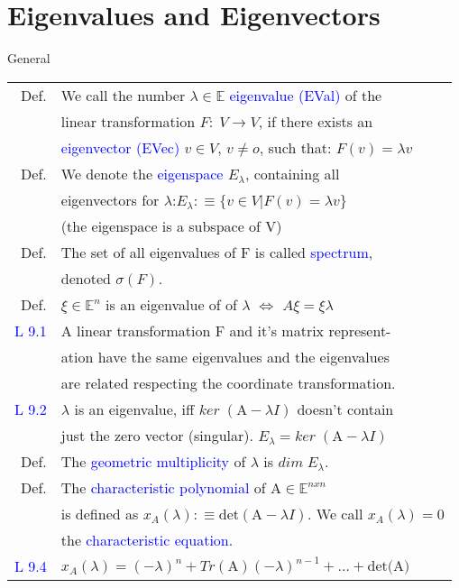 \section{Eigenvalues and Eigenvectors}
\begin{mainbox}{General}
\setlength{\tabcolsep}{2pt}
\begin{tabular}{rl}
	Def. & We call the number $\lambda\in\mathbb{E}$ \textcolor{blue}{eigenvalue (EVal)} of the\\
	& linear transformation $F:\;V\rightarrow V$, if there exists an\\
	& \textcolor{blue}{eigenvector (EVec)} $v\in V$, $v\neq o$, such that: $F(v) = \lambda v$\\
	\rule{0pt}{3ex}
	Def. & We denote the \textcolor{blue}{eigenspace} $E_\lambda$, containing all\\
	& eigenvectors for $\lambda$:\quad $E_\lambda :\equiv \{v\in V | F(v) = \lambda v\}$\\
	& (the eigenspace is a subspace of V)\\
	\rule{0pt}{3ex}
	Def. & The set of all eigenvalues of F is called \textcolor{blue}{spectrum},\\
	& denoted $\sigma (F)$.\\
	\rule{0pt}{3ex}
	Def. & $\xi\in\mathbb{E}^n$ is an eigenvalue of of $\lambda$ $\Leftrightarrow$ $A\xi = \xi\lambda$\\
	\rule{0pt}{3ex}
	\textcolor{blue}{L 9.1} & A linear transformation F and it's matrix represent-\\
	& ation have the same eigenvalues and the eigenvalues\\
	& are related respecting the coordinate transformation.\\
	\rule{0pt}{3ex}
	\textcolor{blue}{L 9.2} & $\lambda$ is an eigenvalue, iff $ker\;(\text{A}-\lambda I)$ doesn't contain\\
	& just the zero vector (singular). $E_\lambda = ker\;(\text{A}-\lambda I)$\\
	\rule{0pt}{3ex}
	Def. & The \textcolor{blue}{geometric multiplicity} of $\lambda$ is $dim\;E_\lambda$.\\
	\rule{0pt}{3ex}
	Def. & The \textcolor{blue}{characteristic polynomial} of A$\in\mathbb{E}^{nxn}$\\
	& is defined as $x_A(\lambda) :\equiv \text{det}(\text{A}-\lambda I)$. We call $x_A(\lambda) = 0$\\
	& the \textcolor{blue}{characteristic equation}.\\
	\rule{0pt}{3ex}
	\textcolor{blue}{L 9.4} & $x_A(\lambda) = (-\lambda)^n + Tr(\text{A})(-\lambda)^{n-1} + \ldots + \text{det(A)}$\\

\end{tabular}
\end{mainbox}
